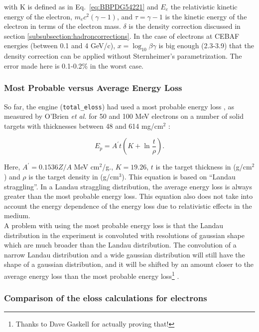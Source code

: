 with K is defined as in Eq.~\ref{eq:BBPDG54221} and $E_e$ the relativistic kinetic
energy of the electron, $m_e c^2 (\gamma-1)$, and $\tau=\gamma-1$ is the kinetic energy
of the electron in terms of the electron mass. $\delta$ is the density correction 
discussed in section \ref{subsubsection:hadroncorrections}.
In the case of electrons at CEBAF energies (between 0.1 and 4 GeV/c), $x=\log_{10}{\beta
\gamma}$ is big enough (2.3-3.9) that the density correction can be applied without 
Sternheimer's parametrization. The error made here is 0.1-0.2\% in the worst case.

\newpage
\subsubsection{Most Probable versus Average Energy Loss}
\hspace*{\parindent}

So far, the engine ({\tt total\_eloss}) had used a most probable energy loss 
\cite{engine}, as measured by O'Brien {\em et al.} for 50 and 100 MeV electrons on a 
number of solid targets with thicknesses between 48 and 614 mg/cm$^2$ \cite{obrien}:

\begin{equation}
\label{eq:obrien}
E_{p}=A^\prime t \left(K+ \ln {\frac{t}{\rho}} \right).
\end{equation} 

Here, $A^\prime= 0.1536 Z/A$ MeV cm$^2$/g., $K=19.26$, $t$ is the target thickness
in (g/cm$^2$) and $\rho$ is the target density in (g/cm$^3$). This equation is based
on ``Landau straggling''. In a Landau straggling distribution, the average energy
loss is always greater than the most probable energy loss. This equation also does not 
take into account the energy dependence of the energy loss due to relativistic effects in 
the medium.\\
A problem with using the most probable energy loss is that the Landau distribution in the 
experiment is convoluted with resolutions of gaussian shape which are much broader than
the Landau distribution. The convolution of a narrow Landau distribution and
a wide gaussian distribution will still have the shape of a gaussian distribution, and
it will be shifted by an amount closer to the average energy loss than the most probable
energy loss\footnote{Thanks to Dave Gaskell for actually proving that!} \cite{Gaskell}. 

\subsubsection{Comparison of the eloss calculations for electrons}
\hspace*{\parindent}

